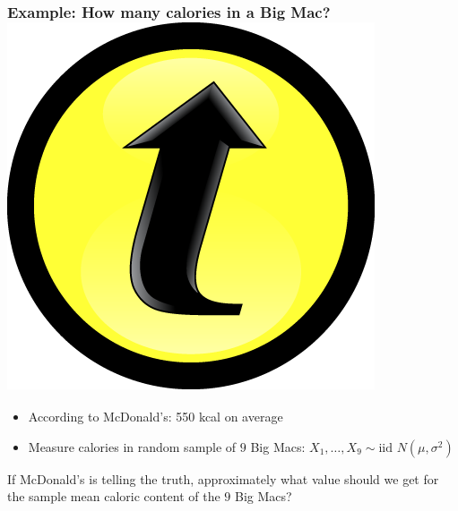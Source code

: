 \documentclass[handout]{beamer}
\begin{document}
\begin{frame}[t]
	\frametitle{Example: How many calories in a Big Mac? \hfill \includegraphics[scale = 0.05]{./images/clicker}}
\begin{itemize}
	\item According to McDonald's: 550 kcal on average
	\item Measure calories in random sample of $9$ Big Macs: $X_1, \hdots, X_{9} \sim \mbox{iid } N(\mu, \sigma^2)$
\end{itemize}

\vspace{1em}

\alert{If McDonald's is telling the truth, approximately what value should we get for the sample mean caloric content of the $9$ Big Macs?} 
\end{frame}
\end{document}
